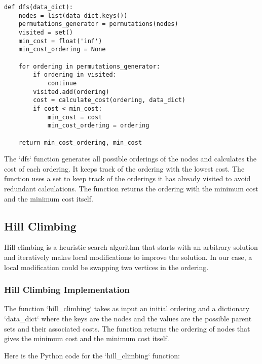 \documentclass{article}
\begin{document}
\begin{verbatim}
def dfs(data_dict):
    nodes = list(data_dict.keys())
    permutations_generator = permutations(nodes)
    visited = set()
    min_cost = float('inf')
    min_cost_ordering = None

    for ordering in permutations_generator:
        if ordering in visited:
            continue
        visited.add(ordering)
        cost = calculate_cost(ordering, data_dict)
        if cost < min_cost:
            min_cost = cost
            min_cost_ordering = ordering

    return min_cost_ordering, min_cost
\end{verbatim}

The `dfs` function generates all possible orderings of the nodes and calculates the cost of each ordering. It keeps track of the ordering with the lowest cost. The function uses a set to keep track of the orderings it has already visited to avoid redundant calculations. The function returns the ordering with the minimum cost and the minimum cost itself.

\subsection{Hill Climbing}

Hill climbing is a heuristic search algorithm that starts with an arbitrary solution and iteratively makes local modifications to improve the solution. In our case, a local modification could be swapping two vertices in the ordering.

\subsubsection{Hill Climbing Implementation}
The function `hill\_climbing` takes as input an initial ordering and a dictionary `data\_dict` where the keys are the nodes and the values are the possible parent sets and their associated costs. The function returns the ordering of nodes that gives the minimum cost and the minimum cost itself.

Here is the Python code for the `hill\_climbing` function:
\end{document}
